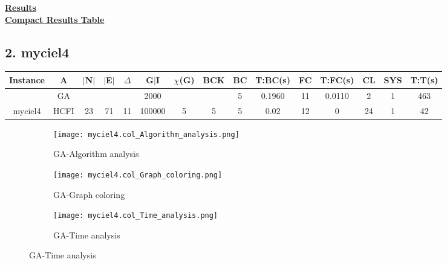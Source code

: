 \documentclass[10pt]{article}
\begin{document}
\vspace{2cm}
\begin{center}
\hyperlink{page.8}{\textbf{Results}}\\
\vspace{0.5cm}
\hyperlink{page.71}{\textbf{Compact Results Table}}
\end{center}
\pagebreak


\subsection*{\hspace{0,9073976cm} 2. myciel4}
\begin{table}[H]
\centering
\begin{tabular}{|c|c|c|c|c|c|c|c|c|c|c|c|c|c|c|}
\hline
Instance& A &$|$N$|$ & $|$E$|$ & $\Delta$ & G$|$I & $\chi$(G) &BCK&BC & T:BC(s) & FC & T:FC(s) & CL & SYS & T:T(s) \\ \hline \hline

	&GA&       &                   &                     &2000         &     \cellcolor{yellow} & {\cellcolor{yellow}}& {{\cellcolor{green}5}}
&0.1960    &11        & 0.0110                  & 2                    & 1         &463         \\ \cline{2-2} \cline{6-6} \cline{9-15}
 \multirow{-2}{*}{myciel4} &HCFI   &\multirow{-2}{*}{23}   &\multirow{-2}{*}{71}     &\multirow{-2}{*}{11}     &100000      &\multirow{-2}{*}{\cellcolor{yellow}5}      & \multirow{-2}{*}{\cellcolor{yellow}5}    &{\cellcolor{green}5}     &0.02         &12    &0         & 24   &1     &42        \\ \hline 

\end{tabular}
\end{table}
\graphicspath{{./Core1/Solutions/GA/myciel4.col}}
\begin{figure}[H]
\begin{subfigure}{.33\textwidth}
  \centering
  \texttt{[image: myciel4.col\_Algorithm\_analysis.png]}
  \caption{GA-Algorithm analysis}
   \label{fig:subfig1}
\end{subfigure}%
\begin{subfigure}{.33\textwidth}
  \centering
  \texttt{[image: myciel4.col\_Graph\_coloring.png]}
  \caption{GA-Graph coloring}
  \label{fig:subfig2}
\end{subfigure}
\begin{subfigure}{.33\textwidth}
  \centering
  \texttt{[image: myciel4.col\_Time\_analysis.png]}
  \caption{GA-Time analysis}
  \end{subfigure}
\end{figure}
\end{document}
